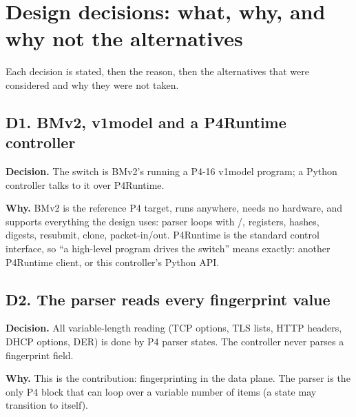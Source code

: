 \section{Design decisions: what, why, and why not the alternatives}
\label{sec:decisions}

Each decision is stated, then the reason, then the alternatives that were considered and why they were not taken.

\newcommand{\decision}[4]{%
\subsection{#1}#2
\par\noindent\textbf{Decision.} #3
\par\noindent\textbf{Why.} #4}

\decision{D1. BMv2, v1model and a P4Runtime controller}{\label{sec:dec-target}}
{The switch is BMv2's \code{simple\_switch\_grpc} running a P4-16 v1model program; a Python controller talks to it
over P4Runtime.}
{BMv2 is the reference P4 target, runs anywhere, needs no hardware, and supports everything the design uses:
parser loops with \code{lookahead}/\code{advance}, registers, hashes, digests, resubmit, clone, packet-in/out.
P4Runtime is the standard control interface, so ``a high-level program drives the switch'' means exactly: another
P4Runtime client, or this controller's Python API.}

\decision{D2. The parser reads every fingerprint value}{\label{sec:dec-parser}}
{All variable-length reading (TCP options, TLS lists, HTTP headers, DHCP options, DER) is done by P4 parser states.
The controller never parses a fingerprint field.}
{This is the contribution: fingerprinting in the data plane. The parser is the only P4 block that can loop over a
variable number of items (a state may transition to itself).}


